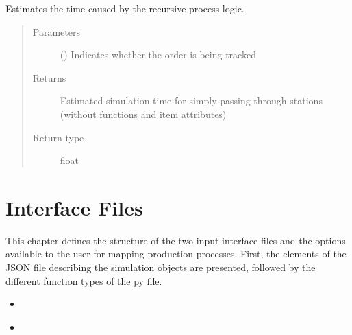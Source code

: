 \documentclass[letterpaper,10pt,english]{sphinxmanual}
\begin{document}
\begin{fulllineitems}
\begin{fulllineitems}
\label{\detokenize{source/API/api:estimator.Estimator.est_station}}
\sphinxAtStartPar
Estimates the time caused by the recursive process logic.
\begin{quote}\begin{description}
\item[{Parameters}] \leavevmode
\sphinxAtStartPar
{} () \textendash{} Indicates whether the order is being tracked

\item[{Returns}] \leavevmode
\sphinxAtStartPar
Estimated simulation time for simply passing through stations (without functions and item attributes)

\item[{Return type}] \leavevmode
\sphinxAtStartPar
float

\end{description}\end{quote}

\end{fulllineitems}


\end{fulllineitems}



\section{Interface Files}
\label{\detokenize{source/Interface_files/interface:interface-files}}\label{\detokenize{source/Interface_files/interface:interface}}\label{\detokenize{source/Interface_files/interface::doc}}
\sphinxAtStartPar
This chapter defines the structure of the two input interface files and the options available to the user for mapping
production processes. First, the elements of the JSON file describing the simulation objects are presented, followed by
the different function types of the py file.
\begin{itemize}
\item {} 
\sphinxAtStartPar
{\hyperref[\detokenize{source/Interface_files/data_file:data-file}]{}}

\item {} 
\sphinxAtStartPar
{\hyperref[\detokenize{source/Interface_files/function_file:function-file}]{}}

\end{itemize}
\end{document}
